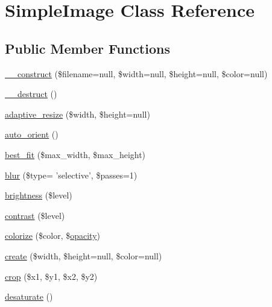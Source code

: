 \hypertarget{classabeautifulsite_1_1_simple_image}{\section{Simple\-Image Class Reference}
\label{classabeautifulsite_1_1_simple_image}
}
\subsection*{Public Member Functions}
\begin{DoxyCompactItemize}
\item 
\hyperlink{classabeautifulsite_1_1_simple_image_ae69773d7ae7457ff1524174317f6ad62}{\-\_\-\-\_\-construct} (\$filename=null, \$width=null, \$height=null, \$color=null)
\item 
\hyperlink{classabeautifulsite_1_1_simple_image_a421831a265621325e1fdd19aace0c758}{\-\_\-\-\_\-destruct} ()
\item 
\hyperlink{classabeautifulsite_1_1_simple_image_a1e67e72870ddf87f3d16b3010cd7d3f2}{adaptive\-\_\-resize} (\$width, \$height=null)
\item 
\hyperlink{classabeautifulsite_1_1_simple_image_a0ed80eb3d0f683447f8c163aba89cc84}{auto\-\_\-orient} ()
\item 
\hyperlink{classabeautifulsite_1_1_simple_image_aaced3f2b7cc91ab8891d9248139338cf}{best\-\_\-fit} (\$max\-\_\-width, \$max\-\_\-height)
\item 
\hyperlink{classabeautifulsite_1_1_simple_image_a693a4a7bc49924eb8c7ca586c3fbc2ba}{blur} (\$type= 'selective', \$passes=1)
\item 
\hyperlink{classabeautifulsite_1_1_simple_image_af571c7cddbd8021822dc8a6c36bd4059}{brightness} (\$level)
\item 
\hyperlink{classabeautifulsite_1_1_simple_image_a7af23605eb273c1084cbbf092bf69c50}{contrast} (\$level)
\item 
\hyperlink{classabeautifulsite_1_1_simple_image_ab133aa5541f0ae97c49d5729ace52c62}{colorize} (\$color, \$\hyperlink{classabeautifulsite_1_1_simple_image_add5b914f35ec96d98f9e3026693a627d}{opacity})
\item 
\hyperlink{classabeautifulsite_1_1_simple_image_aae0bbd9a1af614db7c62fcfcdb906ecb}{create} (\$width, \$height=null, \$color=null)
\item 
\hyperlink{classabeautifulsite_1_1_simple_image_a4363bcc58d31e100cc126fafad73ef1a}{crop} (\$x1, \$y1, \$x2, \$y2)
\item 
\hyperlink{classabeautifulsite_1_1_simple_image_aac9e0740c42741b5b9f2e61991a34112}{desaturate} ()

\end{DoxyCompactItemize}
